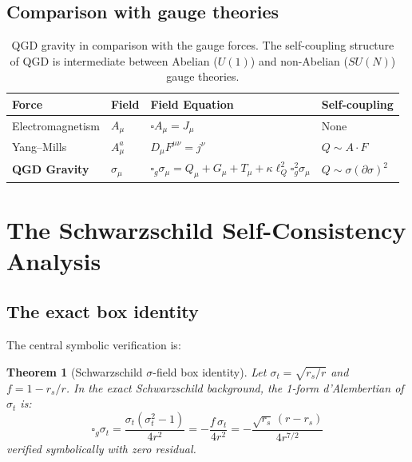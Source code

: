 \documentclass[11pt,a4paper]{article}
\theoremstyle{plain}
\newtheorem{theorem}{Theorem}[section]
\theoremstyle{definition}
\theoremstyle{remark}
\newcommand{\sigt}{\sigma_t}
\newcommand{\rs}{r_s}
\newcommand{\lQ}{\ell_Q}
\newcommand{\boxg}{\square_g}
\begin{document}
\subsection{Comparison with gauge theories}

\begin{table}[h]
\centering
\renewcommand{\arraystretch}{1.4}
\begin{tabular}{@{}p{3.2cm}p{1.8cm}p{6.5cm}p{2.3cm}@{}}
\toprule
Force & Field & Field Equation & Self-coupling \\
\midrule
Electromagnetism & $A_\mu$ & $\square A_\mu = J_\mu$ & None \\
Yang--Mills & $A_\mu^a$ & $D_\mu F^{\mu\nu} = j^\nu$ & $Q\sim A\cdot F$ \\
\textbf{QGD Gravity} & $\sigma_\mu$ &
  $\boxg\sigma_\mu = Q_\mu + G_\mu + T_\mu + \kappa\lQ^2\boxg^2\sigma_\mu$ &
  $Q\sim\sigma(\partial\sigma)^2$ \\
\bottomrule
\end{tabular}
\caption{QGD gravity in comparison with the gauge forces.  The self-coupling structure
of QGD is intermediate between Abelian ($U(1)$) and non-Abelian ($SU(N)$) gauge theories.}
\end{table}

\section{The Schwarzschild Self-Consistency Analysis}
\label{sec:schwarzschild}

\subsection{The exact box identity}

The central symbolic verification is:

\begin{theorem}[Schwarzschild $\sigma$-field box identity]
\label{thm:box}
Let $\sigt = \sqrt{\rs/r}$ and $f = 1 - \rs/r$.  In the exact Schwarzschild
background, the 1-form d'Alembertian of $\sigt$ is:
\begin{equation}
  \boxed{\boxg\sigt
    = \frac{\sigt(\sigt^2-1)}{4r^2}
    = -\frac{f\,\sigt}{4r^2}
    = -\frac{\sqrt{\rs}\,(r-\rs)}{4r^{7/2}}}
  \label{eq:box_result}
\end{equation}
verified symbolically with zero residual.
\end{theorem}
\end{document}
